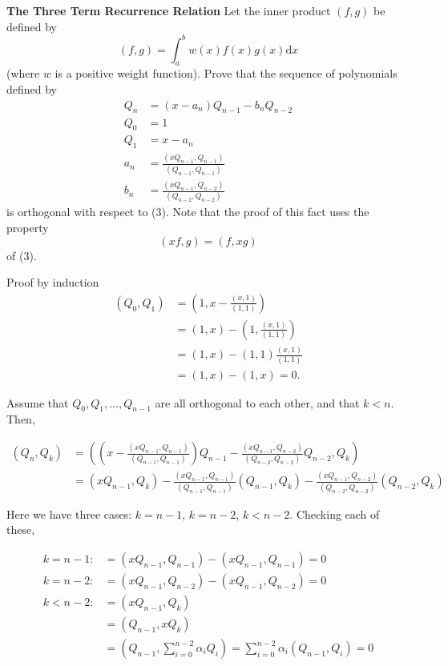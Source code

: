 \textbf{The Three Term Recurrence Relation} Let the inner product
$(f,g)$ be defined by \[(f,g) = \int_a^b w(x) f(x) g(x) \mathrm{d}x\]
(where $w$ is a positive weight function). Prove that the sequence of
polynomials defined by
\[
\begin{aligned}
Q_n &= (x - a_n) Q_{n-1} - b_n Q_{n-2} \\
Q_0 &= 1 \\
Q_1 &= x - a_n \\
a_n &= \frac{(x Q_{n-1}, Q_{n-1})}{(Q_{n-1}, Q_{n-1})} \\
b_n &= \frac{(x Q_{n-1}, Q_{n-2})}{(Q_{n-2}, Q_{n-2})}
\end{aligned}
\]
is orthogonal with respect to (3). Note that the proof of this fact
uses the property \[(xf, g) = (f, xg)\] of (3).

{\color{blue}

Proof by induction
\[
\begin{aligned}
(Q_0, Q_1) &= (1, x - \frac{(x, 1)}{(1,1)}) \\
           &= (1,x) - (1, \frac{(x,1)}{(1,1)}) \\
           &= (1,x) - (1,1) \frac{(x,1)}{(1,1)} \\
           &= (1,x) - (1,x) = 0.
\end{aligned}
\]

Assume that $Q_0, Q_1, \dots, Q_{n-1}$ are all orthogonal to each
other, and that $k<n$. Then,

\[
\begin{aligned}
(Q_n, Q_k) &= \left( \left( x - \frac{(x Q_{n-1}, Q_{n-1})}{(Q_{n-1},
Q_{n-1})} \right) Q_{n-1} - \frac{(x Q_{n-1}, Q_{n-2})}{(Q_{n-2},
Q_{n-2})} Q_{n-2}, Q_k \right) \\
&= (x Q_{n-1}, Q_k) - \frac{(x Q_{n-1}, Q_{n-1})}{(Q_{n-1}, Q_{n-1})}
(Q_{n-1}, Q_k) - \frac{(x Q_{n-1}, Q_{n-2})}{(Q_{n-2}, Q_{n-2})}
(Q_{n-2}, Q_k)
\end{aligned}
\]

Here we have three cases: $k = n-1$, $k = n-2$, $k < n-2$. Checking
each of these,

\[
\begin{aligned}
k = n-1: &= (x Q_{n-1}, Q_{n-1}) - (x Q_{n-1}, Q_{n-1}) = 0 \\
k = n-2: &= (x Q_{n-1}, Q_{n-2}) - (x Q_{n-1}, Q_{n-2}) = 0 \\
k < n-2: &= (x Q_{n-1}, Q_k) \\
&= (Q_{n-1}, x Q_k) \\
&= \left(Q_{n-1}, \sum_{i=0}^{n-2} \alpha_i Q_i\right)
= \sum_{i=0}^{n-2} \alpha_i (Q_{n-1}, Q_i) = 0
\end{aligned}
\]

}
